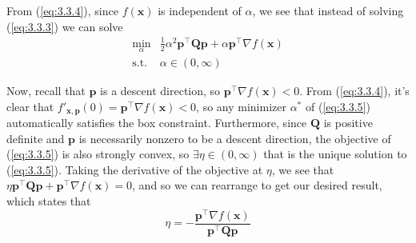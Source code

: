 \documentclass{article}
\begin{document}
From (\ref{eq:3.3.4}), since $ f(\mathbf{x}) $ is independent of $ \alpha $,
we see that instead of solving (\ref{eq:3.3.3}) we can solve
\begin{equation} \label{eq:3.3.5}
    \begin{array}{ll}
        \displaystyle\min_\alpha &
        \frac{1}{2}\alpha^2\mathbf{p}^\top\mathbf{Qp} +
        \alpha\mathbf{p}^\top\nabla f(\mathbf{x}) \\
        \text{s.t.} & \alpha \in (0, \infty)
    \end{array}
\end{equation}

Now, recall that $ \mathbf{p} $ is a descent direction, so
$ \mathbf{p}^\top\nabla f(\mathbf{x}) < 0 $. From (\ref{eq:3.3.4}), it's
clear that $ f'_{\mathbf{x}, \mathbf{p}}(0) =
\mathbf{p}^\top\nabla f(\mathbf{x}) < 0 $, so any minimizer $ \alpha^* $ of
(\ref{eq:3.3.5}) automatically satisfies the box constraint. Furthermore,
since $ \mathbf{Q} $ is positive definite and $ \mathbf{p} $ is necessarily
nonzero to be a descent direction, the objective of (\ref{eq:3.3.5}) is also
strongly convex, so $ \exists \eta \in (0, \infty) $ that is the unique
solution to (\ref{eq:3.3.5}). Taking the derivative of the objective at
$ \eta $, we see that
$ \eta\mathbf{p}^\top\mathbf{Qp} + \mathbf{p}^\top\nabla f(\mathbf{x}) = 0 $,
and so we can rearrange to get our desired result, which states that
\begin{equation} \label{eq:3.3.6}
    \eta =
    -\frac{\mathbf{p}^\top\nabla f(\mathbf{x})}{\mathbf{p}^\top\mathbf{Qp}}
\end{equation}

%
\end{document}
